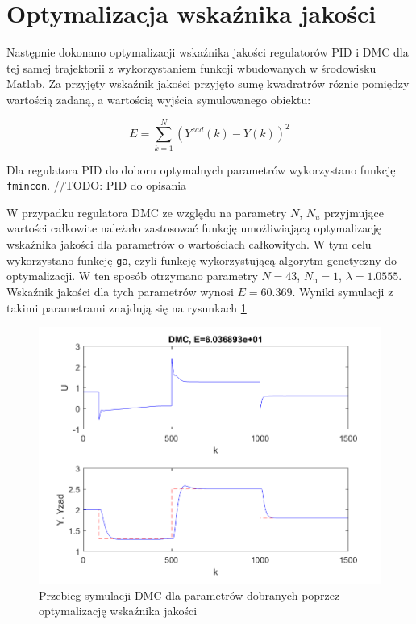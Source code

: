 \section{Optymalizacja wskaźnika jakości}
Następnie dokonano optymalizacji wskaźnika jakości regulatorów PID i DMC dla tej samej trajektorii z wykorzystaniem funkcji wbudowanych w środowisku Matlab. Za przyjęty wskaźnik jakości przyjęto sumę kwadratrów róznic pomiędzy wartością zadaną, a wartością wyjścia symulowanego obiektu:

\begin{equation}
E = \sum_{k=1}^{N} (Y^{zad}(k)-Y(k))^2
\end{equation}

Dla regulatora PID do doboru optymalnych parametrów wykorzystano funkcję 
\verb+fmincon+. //TODO: PID do opisania

W przypadku regulatora DMC ze względu na parametry $N$, $N_u$ przyjmujące wartości całkowite należało zastosować funkcję umożliwiającą optymalizację wskaźnika jakości dla parametrów o wartościach całkowitych. W tym celu wykorzystano funkcję \verb+ga+, czyli funkcję wykorzystującą algorytm genetyczny do optymalizacji. W ten sposób otrzymano parametry $N=43$, $N_\mathrm{u}=1$, $\lambda=\num{1.0555}$. Wskaźnik jakości dla tych parametrów wynosi $E=\num{60.369}$. Wyniki symulacji z takimi parametrami znajdują się na rysunkach \ref{dmcopt}

\begin{figure}
\label{dmcopt}
\centering
\caption{Przebieg symulacji DMC dla parametrów dobranych poprzez optymalizację wskaźnika jakości}
\includegraphics{dmc_optimized.png}
\end{figure}